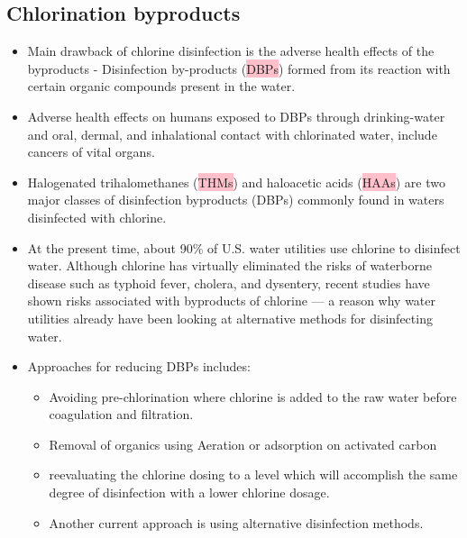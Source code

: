 \subsection{Chlorination byproducts}
\begin{itemize}
\item Main drawback of chlorine disinfection is the adverse health effects of the byproducts - Disinfection by-products (\colorbox{pink}{DBPs}) formed from its reaction with certain organic compounds present in the water.
\item  Adverse health effects on humans exposed to DBPs through drinking-water and oral, dermal, and inhalational contact with chlorinated water, include cancers of vital organs.
\item Halogenated trihalomethanes (\colorbox{pink}{THMs}) and haloacetic acids (\colorbox{pink}{HAAs}) are two major classes of disinfection byproducts (DBPs) commonly found in waters disinfected with chlorine. 
\item At the present time, about 90\% of U.S. water utilities use chlorine to disinfect water. Although chlorine has virtually eliminated the risks of waterborne disease such as typhoid fever, cholera, and dysentery, recent studies have shown risks associated with byproducts of chlorine — a reason why water utilities already have been looking at alternative methods for disinfecting water.
\item Approaches for reducing DBPs includes:
\begin{itemize}
\item Avoiding pre-chlorination where chlorine is added to the raw water before coagulation and filtration.
\item Removal of organics using Aeration or adsorption on activated carbon 
\item reevaluating the chlorine dosing to a level which will accomplish the same degree of disinfection with a lower chlorine dosage.
\item Another current approach is using alternative disinfection methods.
\end{itemize}
\end{itemize}

